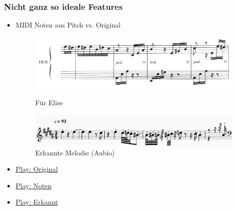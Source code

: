\documentclass[12pt]{FSUBeamer_official}
\begin{document}
\begin{frame}
	\frametitle{Nicht ganz so ideale Features}
	\begin{itemize}
		\item MIDI Noten aus Pitch vs. Original 
		\begin{figure}[ht]
			\begin{minipage}[b]{0.45\linewidth}
				\centering
				\includegraphics[width=\textwidth]{pics/Notes/felise.png}
				\caption{Für Elise~\cite{fe1}}
				\label{fe2}
			\end{minipage}
			\hspace{0.5cm}
			\begin{minipage}[b]{0.45\linewidth}
				\centering
				\includegraphics[width=\textwidth]{pics/Notes/feam.png}
				\caption{Erkannte Melodie (Aubio)}
				\label{fem}
			\end{minipage}
		\end{figure}
		\item \href{run:sounds/elise.mp3}{Play: Original}
		\item \href{run:sounds/Felise1.mp3}{Play: Noten}
		\item \href{run:sounds/Felise2.mp3}{Play: Erkannt}
	\end{itemize}
\end{frame}
\end{document}
